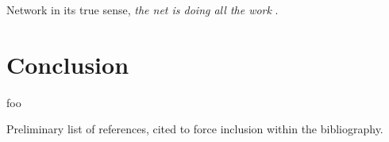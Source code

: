 \documentclass[12pt, a4paper]{article}
\begin{document}
Network in its true sense, \textit{the net is doing all the work} \cite{net_doing_all_the_work}.

\cite{ahah}




\section{Conclusion}

foo


Preliminary list of references, cited to force inclusion within the bibliography.


\cite{computational_abilities} \cite{optical_processing} \cite{capacity_of_nonmonotonic_model} \cite{stimulus_unitization_and_aging}

\cite{ackley1985learning} \cite{capacity_of_hopfield} \cite{high-order_neural_networks} \cite{neural_network_models_for_associative_memory} \cite{sparsely_encoded_associative_memory}

\cite{memsistor} \cite{principle_of_neural_associative_memory} \cite{parallel_models_of_associative_memory} \cite{associative_memory_using_small-world_architecture} \cite{associatron} \cite{associative_search_network} \cite{deep_machine_learning} \cite{on_associative_memory} \cite{from_cell_to_cortex} \cite{ahah}


\end{document}
